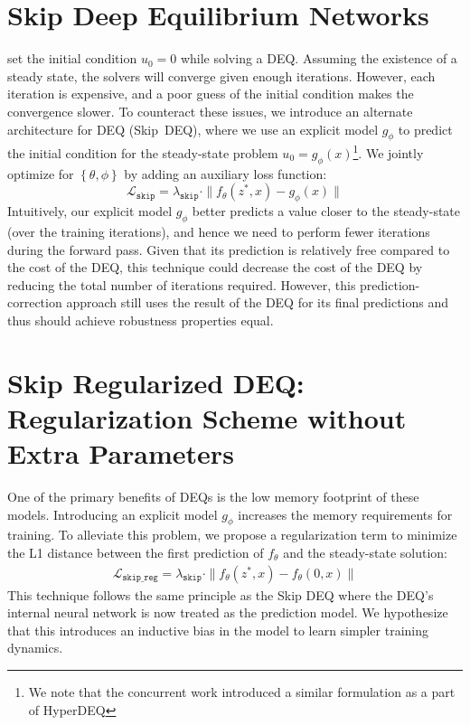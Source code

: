 \section{Skip Deep Equilibrium Networks}
\label{sec:skip_deqs}

\citet{bai_deep_2019, bai_multiscale_2020} set the initial condition $u_0 = 0$ while solving a DEQ. Assuming the existence of a steady state, the solvers will converge given enough iterations. However, each iteration is expensive, and a poor guess of the initial condition makes the convergence slower. To counteract these issues, we introduce an alternate architecture for DEQ (Skip~DEQ), where we use an explicit model $g_\phi$ to predict the initial condition for the steady-state problem $u_0 = g_\phi(x)$\footnote{We note that the concurrent work \citet{bai2021neural} introduced a similar formulation as a part of HyperDEQ}. We jointly optimize for $\left\{\theta, \phi\right\}$ by adding an auxiliary loss function:
%
\begin{equation}
    \mathcal{L}_{\texttt{skip}} = \lambda_{\texttt{skip}} \cdot \| f_\theta(z^*, x) - g_\phi(x) \|
\end{equation}
%
Intuitively, our explicit model $g_\phi$ better predicts a value closer to the steady-state (over the training iterations), and hence we need to perform fewer iterations during the forward pass. Given that its prediction is relatively free compared to the cost of the DEQ, this technique could decrease the cost of the DEQ by reducing the total number of iterations required. However, this prediction-correction approach still uses the result of the DEQ for its final predictions and thus should achieve robustness properties equal.

\section{Skip Regularized DEQ: Regularization Scheme without Extra Parameters}
\label{sec:skip_reg_deq}

One of the primary benefits of DEQs is the low memory footprint of these models. Introducing an explicit model $g_\phi$ increases the memory requirements for training. To alleviate this problem, we propose a regularization term to minimize the L1 distance between the first prediction of $f_\theta$ and the steady-state solution:
%
\begin{align}
    \mathcal{L}_{\texttt{skip\_reg}} = \lambda_{\texttt{skip}} \cdot \| f_\theta(z^*, x) - f_\theta(0, x) \|
\end{align}
%
This technique follows the same principle as the Skip DEQ where the DEQ's internal neural network is now treated as the prediction model. We hypothesize that this introduces an inductive bias in the model to learn simpler training dynamics.

